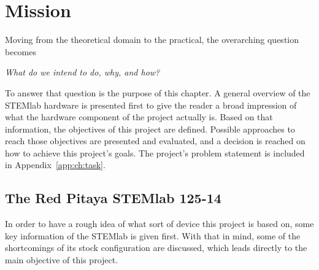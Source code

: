 %
%
\chapter{Mission} %
\label{ch:mission}
%
%

Moving from the theoretical domain  to the practical, the overarching question
becomes
\begin{center}
    \emph{What do  we intend to do, why, and how?}
\end{center}
To answer that question is the  purpose of this chapter. A general overview of
the STEMlab hardware is presented first  to give the reader a broad impression
of what  the hardware  component of  the project actually  is.  Based  on that
information, the  objectives of this project  are defined. Possible approaches
to  reach those  objectives are  presented and  evaluated, and  a decision  is
reached  on  how  to  achieve  this  project's  goals. The  project's  problem
statement is included in Appendix~\ref{app:ch:task}.

%
%
\section{The Red Pitaya STEMlab 125-14} %
\label{sec:stl125}

In order to have a rough idea of what sort of device this project is based on,
some key information of the STEMlab is given first. With that in mind, some of
the  shortcomings  of  its  stock configuration  are  discussed,  which  leads
directly to the main objective of this project.

%
%
